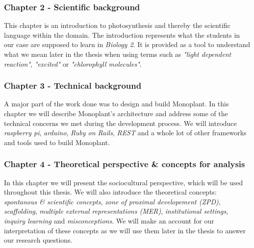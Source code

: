 \subsubsection*{Chapter 2 - Scientific background}
This chapter is an introduction to photosynthesis and thereby the scientific language within the domain. The introduction represents what the students in our case are supposed to learn in \emph{Biology 2}. It is provided as a tool to understand what we mean later in the thesis when using terms such as \emph{"light dependent reaction"}, \emph{"excited"} or \emph{"chlorophyll molecules"}.

\subsubsection*{Chapter 3 - Technical background}
A major part of the work done was to design and build Monoplant. In this chapter we will describe Monoplant's architecture and address some of the technical concerns we met during the development process. We will introduce \emph{raspberry pi}, \emph{arduino}, \emph{Ruby on Rails}, \emph{REST} and a whole lot of other frameworks and tools used to build Monoplant.

\subsubsection*{Chapter 4 - Theoretical perspective \& concepts for analysis}

In this chapter we will present the sociocultural perspective, which will be used throughout this thesis. We will also introduce the theoretical concepts: \emph{spontanous \& scientific concepts}, \emph{zone of proximal developement (ZPD)}, \emph{scaffolding}, \emph{multiple external representations (MER)}, \emph{institutional settings}, \emph{inquiry learning} and \emph{misconceptions}. We will make an account for our interpretation of these concepts as we will use them later in the thesis to answer our research questions. 

